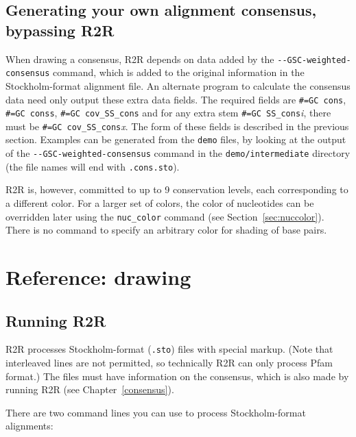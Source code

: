 \documentclass[letterpaper,12pt]{report}
\begin{document}
\section{Generating your own alignment consensus, bypassing R2R}
\label{sec:consensuswithoutGSC}

When drawing a consensus,
R2R depends on data added by the {\tt -{}-GSC-weighted-consensus} command, which is added
to the original information in the Stockholm-format alignment file.
An alternate program to calculate the consensus data need only output these extra data fields.
The required fields are {\tt \#=GC cons}, {\tt \#=GC conss}, {\tt \#=GC cov\_SS\_cons}
and for any extra stem {\tt \#=GC SS\_cons}{\it i}, there must be {\tt \#=GC cov\_SS\_cons}{\it x}.
The form of these fields is described in the previous section.
Examples can be generated from the {\tt demo} files, by looking at the 
output of the  {\tt -{}-GSC-weighted-consensus} command
in the {\tt demo/intermediate} directory (the file names will end with {\tt .cons.sto}).

R2R is, however, committed to up to 9 conservation levels, each corresponding to a different color.
For a larger set of colors, the color of nucleotides can be overridden later using the {\tt nuc\_color} command (see Section~\ref{sec:nuccolor}).  There is no command to specify an arbitrary color 
for shading of base pairs.

\chapter{Reference: drawing}

\section{Running R2R}

R2R processes Stockholm-format ({\tt .sto}) files with special markup.
(Note that interleaved lines are not permitted, so technically R2R can only process Pfam format.)  The files must have information on the consensus, which is also made by running R2R
(see Chapter~\ref{consensus}).

There are two command lines you can use to process Stockholm-format alignments:
\end{document}
